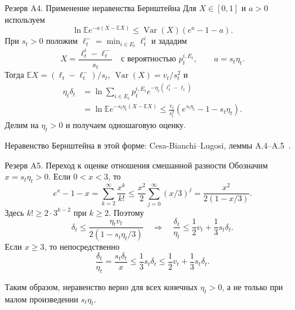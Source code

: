 \documentclass[11pt,aspectratio=169]{beamer}
\begin{document}
\begin{frame}{Резерв A4. Применение неравенства Бернштейна}
  Для $X\in[0,1]$ и $a>0$ используем
  \[\ln\mathbb{E} e^{-a(X-\mathbb{E} X)}\le\operatorname{Var}(X)(e^a-1-a).\]
  При $s_t>0$ положим $\ell_t^-=\min_{i\in E_t}\ell_t^i$ и зададим
  \[
    X=\frac{\ell_t^i-\ell_t^-}{s_t}
       \quad\text{с вероятностью } p_t^{i,E_t},\qquad a=s_t\eta_t.
  \]
  Тогда $\mathbb{E} X=(\ell_t-\ell_t^-)/s_t$, $\operatorname{Var}(X)=v_t/s_t^2$ и
  \begin{align*}
    \eta_t\delta_t
       &=\ln\sum_{i\in E_t} p_t^{i,E_t} e^{-\eta_t(\ell_t^i-\ell_t)}\\
       &=\ln\mathbb{E} e^{-s_t\eta_t(X-\mathbb{E} X)}
         \le\frac{v_t}{s_t^2}\left(e^{s_t\eta_t}-1-s_t\eta_t\right).
  \end{align*}
  Делим на $\eta_t>0$ и получаем одношаговую оценку.
  \par\vfill{\scriptsize Неравенство Бернштейна в этой форме: Cesa-Bianchi--Lugosi, леммы A.4--A.5~\cite{CBL}.\par}
\end{frame}

\begin{frame}{Резерв A5. Переход к оценке отношения смешанной разности}
  Обозначим $x=s_t\eta_t>0$. Если $0<x<3$, то
  \[
    e^x-1-x=\sum_{k=2}^{\infty}\frac{x^k}{k!}
      \le\frac{x^2}{2}\sum_{j=0}^{\infty}(x/3)^j
      =\frac{x^2}{2(1-x/3)}.
  \]
  Здесь $k!\ge2\cdot3^{k-2}$ при $k\ge2$. Поэтому
  \[
    \delta_t\le\frac{\eta_t v_t}{2(1-s_t\eta_t/3)}
    \quad\Longrightarrow\quad
    \frac{\delta_t}{\eta_t}\le\frac12v_t+\frac13s_t\delta_t.
  \]
  Если $x\ge3$, то непосредственно
  \[
    \frac{\delta_t}{\eta_t}=\frac{s_t\delta_t}{x}
       \le\frac13s_t\delta_t
       \le\frac12v_t+\frac13s_t\delta_t.
  \]
  \par\vfill{\scriptsize Таким образом, неравенство верно для всех конечных $\eta_t>0$, а не только при малом произведении $s_t\eta_t$.\par}
\end{frame}
\end{document}
